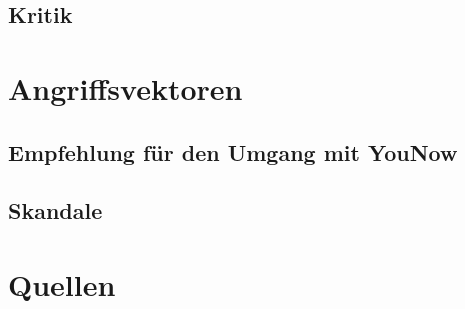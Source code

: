 \documentclass[a4paper,12pt]{scrartcl}
\begin{document}
\subsection{Kritik}


\section{Angriffsvektoren}


\subsection{Empfehlung für den Umgang mit YouNow}

\subsection{Skandale}


\pagebreak

\section{Quellen}

\end{document}

